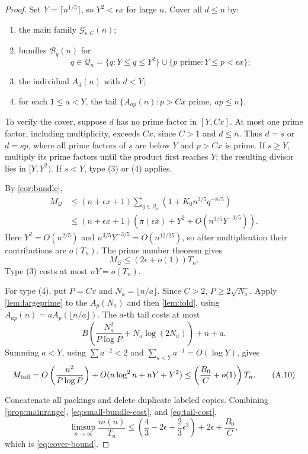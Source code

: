 \documentclass[11pt,a4paper]{article}
\theoremstyle{plain}
\theoremstyle{definition}
\theoremstyle{remark}
\newcommand{\cB}{\mathcal B}
\newcommand{\cG}{\mathcal G}
\newcommand{\cQ}{\mathcal Q}
\begin{document}
\label{pf:cover}
\propcover*
\begin{proof}
Set $Y=\lceil n^{1/5}\rceil$, so $Y^2<\epsilon x$ for large $n$. Cover all $d\le n$ by:
\begin{enumerate}[label=\textup{(\arabic*)}]
\item the main family $\cG_{\epsilon,C}(n)$;
\item bundles $\cB_q(n)$ for
\[
 q\in\cQ_n=\{q:Y\le q\le Y^2\}
 \cup\{p\text{ prime}:Y\le p<\epsilon x\};
\]
\item the individual $A_d(n)$ with $d<Y$;
\item for each $1\le a<Y$, the tail $\{A_{ap}(n):p>Cx\text{ prime},\ ap\le n\}$.
\end{enumerate}
To verify the cover, suppose $d$ has no prime factor in $[Y,Cx]$. At most one prime factor, including multiplicity, exceeds $Cx$, since $C>1$ and $d\le n$. Thus $d=s$ or $d=sp$, where all prime factors of $s$ are below $Y$ and $p>Cx$ is prime. If $s\ge Y$, multiply its prime factors until the product first reaches $Y$; the resulting divisor lies in $[Y,Y^2)$. If $s<Y$, type (3) or (4) applies.

By \cref{cor:bundle},
\[
\begin{aligned}
M_{\cQ}
&\le(n+\epsilon x+1)
\sum_{q\in\cQ_n}\left(1+K_0n^{3/5}q^{-8/5}\right)\\
&\le(n+\epsilon x+1)
\left(\pi(\epsilon x)+Y^2+O(n^{3/5}Y^{-3/5})\right).
\end{aligned}
\]
Here $Y^2=O(n^{2/5})$ and $n^{3/5}Y^{-3/5}=O(n^{12/25})$, so after multiplication their contributions are $o(T_n)$. The prime number theorem gives
\[
 M_{\cQ}\le(2\epsilon+o(1))T_n.
\tag{A.9}\label{eq:small-bundle-cost}
\]
Type (3) costs at most $nY=o(T_n)$.

For type (4), put $P=Cx$ and $N_a=\lfloor n/a\rfloor$. Since $C>2$, $P\ge2\sqrt{N_a}$. Apply \cref{lem:largeprime} to the $A_p(N_a)$ and then \cref{lem:fold}, using $A_{ap}(n)=aA_p(\lfloor n/a\rfloor)$. The $a$-th tail costs at most
\[
 B\left(\frac{N_a^2}{P\log P}+N_a\log(2N_a)\right)+n+a.
\]
Summing $a<Y$, using $\sum a^{-2}<2$ and $\sum_{a<Y}a^{-1}=O(\log Y)$, gives
\[
 M_{\rm tail}
 =O\left(\frac{n^2}{P\log P}\right)
  +O(n\log^2n+nY+Y^2)
 \le\left(\frac{B_0}{C}+o(1)\right)T_n.
\tag{A.10}\label{eq:tail-cost}
\]

Concatenate all packings and delete duplicate labeled copies. Combining \cref{prop:mainrange}, \eqref{eq:small-bundle-cost}, and \eqref{eq:tail-cost},
\[
\limsup_{n\to\infty}\frac{m(n)}{T_n}
\le\left(\frac43-2\epsilon+\frac23\epsilon^3\right)
+2\epsilon+\frac{B_0}{C},
\]
which is \eqref{eq:cover-bound}.
\end{proof}
\end{document}
